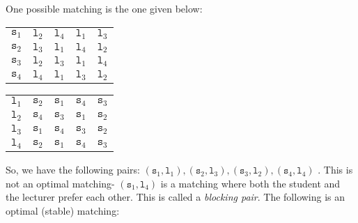 \documentclass[a4paper, openany]{memoir}
\begin{document}
    \noindent One possible matching is the one given below:
    \begin{table}[H]
        \centering
        \begin{subtable}{0.45\textwidth}
            \centering
            \begin{tabular}{c|cccc}
                $\texttt{s}_1$ & $\texttt{l}_2$ & {\color{red} $\texttt{l}_4$} & \underline{$\texttt{l}_1$} & $\texttt{l}_3$ \\
                $\texttt{s}_2$ & \underline{$\texttt{l}_3$} & $\texttt{l}_1$ & $\texttt{l}_4$ & $\texttt{l}_2$ \\
                $\texttt{s}_3$ & \underline{$\texttt{l}_2$} & $\texttt{l}_3$ & $\texttt{l}_1$ & $\texttt{l}_4$ \\
                $\texttt{s}_4$ & \underline{$\texttt{l}_4$} & $\texttt{l}_1$ & $\texttt{l}_3$ & $\texttt{l}_2$
            \end{tabular}
        \end{subtable}
        \hfill
        \begin{subtable}{0.45\textwidth}
            \centering
            \begin{tabular}{c|cccc}
                $\texttt{l}_1$ & $\texttt{s}_2$ & \underline{$\texttt{s}_1$} & $\texttt{s}_4$ & $\texttt{s}_3$ \\
                $\texttt{l}_2$ & $\texttt{s}_4$ & \underline{$\texttt{s}_3$} & $\texttt{s}_1$ & $\texttt{s}_2$ \\
                $\texttt{l}_3$ & $\texttt{s}_1$ & $\texttt{s}_4$ & $\texttt{s}_3$ & \underline{$\texttt{s}_2$} \\
                $\texttt{l}_4$ & $\texttt{s}_2$ & {\color{red} $\texttt{s}_1$} & \underline{$\texttt{s}_4$} & $\texttt{s}_3$
            \end{tabular}
        \end{subtable}
    \end{table}
    \noindent So, we have the following pairs: $(\texttt{s}_1, \texttt{l}_1), (\texttt{s}_2, \texttt{l}_3), (\texttt{s}_3, \texttt{l}_2), (\texttt{s}_4, \texttt{l}_4)$ . This is not an optimal matching- $(\texttt{s}_1, \texttt{l}_4)$ is a matching where both the student and the lecturer prefer each other. This is called a \emph{blocking pair}. The following is an optimal (stable) matching:
\end{document}
